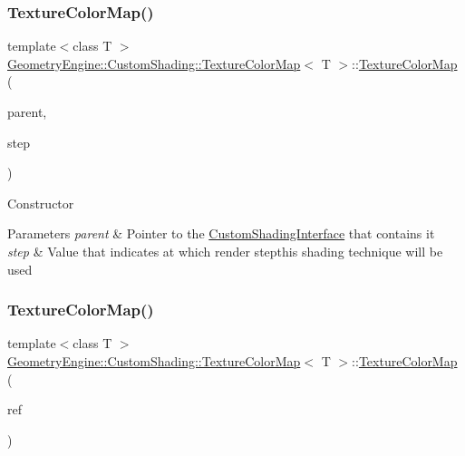 \subsubsection{\texorpdfstring{TextureColorMap()}{TextureColorMap()}\hspace{0.1cm}{\footnotesize\ttfamily [1/2]}}
{\footnotesize\ttfamily template$<$class T $>$ \\
\mbox{\hyperlink{class_geometry_engine_1_1_custom_shading_1_1_texture_color_map}{Geometry\+Engine\+::\+Custom\+Shading\+::\+Texture\+Color\+Map}}$<$ T $>$\+::\mbox{\hyperlink{class_geometry_engine_1_1_custom_shading_1_1_texture_color_map}{Texture\+Color\+Map}} (\begin{DoxyParamCaption}\item[{\mbox{\hyperlink{class_geometry_engine_1_1_custom_shading_1_1_custom_shading_interface}{Custom\+Shading\+Interface}} $\ast$}]{parent,  }\item[{\mbox{\hyperlink{namespace_geometry_engine_1_1_custom_shading_a2dc236a5b567da5099069ce2b2be5609}{Custom\+Shading\+Steps}}}]{step }\end{DoxyParamCaption})\hspace{0.3cm}{\ttfamily [inline]}}

Constructor 
\begin{DoxyParams}{Parameters}
{\em parent} & Pointer to the \mbox{\hyperlink{class_geometry_engine_1_1_custom_shading_1_1_custom_shading_interface}{Custom\+Shading\+Interface}} that contains it \\
\hline
{\em step} & Value that indicates at which render stepthis shading technique will be used \\
\hline
\end{DoxyParams}
\mbox{\label{class_geometry_engine_1_1_custom_shading_1_1_texture_color_map_a78b2a1cecd9e82a5b3e80a29509685de}} 
\subsubsection{\texorpdfstring{TextureColorMap()}{TextureColorMap()}\hspace{0.1cm}{\footnotesize\ttfamily [2/2]}}
{\footnotesize\ttfamily template$<$class T $>$ \\
\mbox{\hyperlink{class_geometry_engine_1_1_custom_shading_1_1_texture_color_map}{Geometry\+Engine\+::\+Custom\+Shading\+::\+Texture\+Color\+Map}}$<$ T $>$\+::\mbox{\hyperlink{class_geometry_engine_1_1_custom_shading_1_1_texture_color_map}{Texture\+Color\+Map}} (\begin{DoxyParamCaption}\item[{const \mbox{\hyperlink{class_geometry_engine_1_1_custom_shading_1_1_custom_shading_step}{Custom\+Shading\+Step}} \&}]{ref }\end{DoxyParamCaption})\hspace{0.3cm}{\ttfamily [inline]}}

